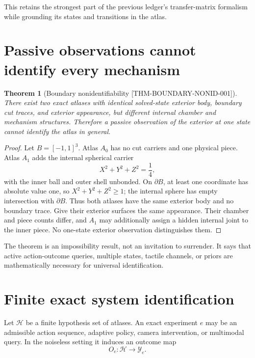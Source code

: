 \documentclass[11pt,openany]{book}
\newcommand{\claimid}[1]{\textnormal{\sffamily\footnotesize[#1]}}
\theoremstyle{polyplain}
\newtheorem{theorem}{Theorem}[chapter]
\theoremstyle{polydef}
\begin{document}
This retains the strongest part of the previous ledger's transfer-matrix formalism while grounding its states and transitions in the atlas.

\section{Passive observations cannot identify every mechanism}

\begin{theorem}[Boundary nonidentifiability \claimid{THM-BOUNDARY-NONID-001}]
\label{thm:boundary-nonidentifiability}
There exist two exact atlases with identical solved-state exterior body, boundary cut traces, and exterior appearance, but different internal chamber and mechanism structures. Therefore a passive observation of the exterior at one state cannot identify the atlas in general.
\end{theorem}

\begin{proof}
Let $B=[-1,1]^3$. Atlas $A_0$ has no cut carriers and one physical piece. Atlas $A_1$ adds the internal spherical carrier
\[
X^2+Y^2+Z^2=\frac14,
\]
with the inner ball and outer shell unbonded. On $\partial B$, at least one coordinate has absolute value one, so $X^2+Y^2+Z^2\ge1$; the internal sphere has empty intersection with $\partial B$. Thus both atlases have the same exterior body and no boundary trace. Give their exterior surfaces the same appearance. Their chamber and piece counts differ, and $A_1$ may additionally assign a hidden internal joint to the inner piece. No one-state exterior observation distinguishes them.
\end{proof}

The theorem is an impossibility result, not an invitation to surrender. It says that active action-outcome queries, multiple states, tactile channels, or priors are mathematically necessary for universal identification.

\section{Finite exact system identification}
\label{sec:active-identification}

Let $\mathcal H$ be a finite hypothesis set of atlases. An exact experiment $e$ may be an admissible action sequence, adaptive policy, camera intervention, or multimodal query. In the noiseless setting it induces an outcome map
\[
O_e:\mathcal H\to\mathcal Y_e.
\]
\end{document}
